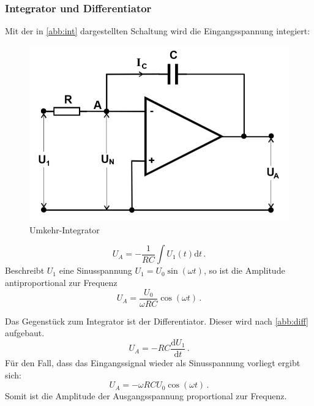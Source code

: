 \subsubsection{Integrator und Differentiator}
Mit der in \autoref{abb:int} dargestellten Schaltung wird die Eingangsspannung integiert:
\begin{figure}[h!]
 	\centering
 	\includegraphics[width=\textwidth]{img/int.png}
 	\caption{Umkehr-Integrator \cite{FP}}
 	\label{abb:int}
\end{figure}
\begin{equation}
U_A = - \frac{1}{RC} \int U_1(t) \text{d}t \, .
\end{equation}
Beschreibt $U_1$ eine Sinusspannung $U_1 = U_0 \sin(\omega t)$, so ist die Amplitude antiproportional zur Frequenz
\begin{equation}
U_A = \frac{U_0}{\omega RC} \cos(\omega t) \, .
\end{equation}

\noindent Das Gegenstück zum Integrator ist der Differentiator. Dieser wird nach \autoref{abb:diff} aufgebaut.
\begin{equation}
U_A = -RC \frac{\text{d} U_1}{\text{d} t} \, .
\end{equation}
Für den Fall, dass das Eingangssignal wieder als Sinusspannung vorliegt ergibt sich:
\begin{equation}
U_A = -\omega RCU_0 \cos(\omega t) \, .
\end{equation}
Somit ist die Amplitude der Ausgangsspannung proportional zur Frequenz.

